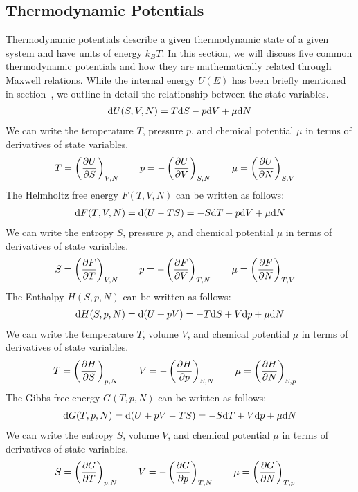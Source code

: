 \subsection{Thermodynamic Potentials}\label{potentials}
Thermodynamic potentials describe a given thermodynamic state of a given system and
have units of energy $k_BT$. In this section, we will discuss five common thermodynamic potentials and how they are mathematically related through Maxwell relations.
While the internal energy $U(E)$ has been briefly mentioned in section~, we outline in detail the relationship between the state variables.
\begin{align}
    \text{d}U(S,V,N) = T\text{d}S-p\text{d}V+\mu\text{d}N
\end{align}
We can write the temperature $T$, pressure $p$, and chemical potential $\mu$ in terms of derivatives of state variables.
\begin{align}\label{maxU}
    T = \left( \pdv{U}{S}\right )_{V,N}  \quad\quad 
    p = -\left( \pdv{U}{V}\right )_{S,N}  \quad\quad 
    \mu = \left( \pdv{U}{N}\right )_{S,V}  \quad
\end{align}
The Helmholtz free energy $F(T,V,N)$ can be written as follows:
\begin{align}
    \text{d}F(T,V,N) = \text{d}(U-TS) = -S\text{d}T-p\text{d}V+\mu\text{d}N
\end{align}
We can write the entropy $S$, pressure $p$, and chemical potential $\mu$ in terms of derivatives of state variables.
\begin{align}\label{maxF}
    S = \left( \pdv{F}{T}\right )_{V,N}  \quad\quad 
    p = -\left( \pdv{F}{V}\right )_{T,N}  \quad\quad 
    \mu = \left( \pdv{F}{N}\right )_{T,V}  \quad
\end{align}
The Enthalpy $H(S,p,N)$ can be written as follows:
\begin{align}
    \text{d}H(S,p,N) = \text{d}(U+pV) = -T\text{d}S+V\text{d}p+\mu\text{d}N
\end{align}
We can write the temperature $T$, volume $V$, and chemical potential $\mu$ in terms of derivatives of state variables.
\begin{align}\label{maxH}
    T = \left( \pdv{H}{S}\right )_{p,N}  \quad\quad 
    V = -\left( \pdv{H}{p}\right )_{S,N}  \quad\quad 
    \mu = \left( \pdv{H}{N}\right )_{S,p}  \quad
\end{align}
The Gibbs free energy $G(T,p,N)$ can be written as follows:
\begin{align}
    \text{d}G(T,p,N) = \text{d}(U+pV-TS) = -S\text{d}T+V\text{d}p+\mu\text{d}N
\end{align}
We can write the entropy $S$, volume $V$, and chemical potential $\mu$ in terms of derivatives of state variables.
\begin{align}\label{maxG}
    S = \left( \pdv{G}{T}\right )_{p,N}  \quad\quad 
    V = -\left( \pdv{G}{p}\right )_{T,N}  \quad\quad 
    \mu = \left( \pdv{G}{N}\right )_{T,p}  \quad
\end{align}

